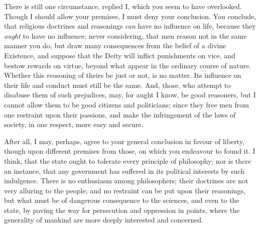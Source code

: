 \documentclass[]{article}
\begin{document}
\begin{sectionbody}
\humeparagraph  There is still one circumstance, replied I, which you seem to have overlooked. Though I should allow your premises, I must deny your conclusion. You conclude, that religious doctrines and reasonings \emph{can} have no influence on life, because they \emph{ought} to have no influence; never considering, that men reason not in the same manner you do, but draw many consequences from the belief of a divine Existence, and suppose that the Deity will inflict punishments on vice, and bestow rewards on virtue, beyond what appear in the ordinary course of nature. Whether this reasoning of theirs be just or not, is no matter. Its influence on their life and conduct must still be the same. And, those, who attempt to disabuse them of such prejudices, may, for aught I know, be good reasoners, but I cannot allow them to be good citizens and politicians; since they free men from one restraint upon their passions, and make the infringement of the laws of society, in one respect, more easy and secure.

\humeparagraph  After all, I may, perhaps, agree to your general conclusion in favour of liberty, though upon different premises from those, on which you endeavour to found it. I think, that the state ought to tolerate every principle of philosophy; nor is there an instance, that any government has suffered in its political interests by such indulgence. There is no enthusiasm among philosophers; their doctrines are not very alluring to the people; and no restraint can be put upon their reasonings, but what must be of dangerous consequence to the sciences, and even to the state, by paving the way for persecution and oppression in points, where the generality of mankind are more deeply interested and concerned.


\end{sectionbody}
\end{document}
